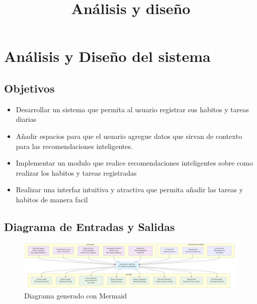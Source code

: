 \documentclass{pretexto/report}
\title{Análisis y diseño}
\begin{document}

                                                     

\tableofcontents 
\pagebreak



\pagebreak
\section{Análisis y Diseño del sistema}

\subsection{Objetivos}

\begin{itemize}
    \item Desarrollar un sistema que permita al usuario registrar sus habitos y tareas diarias
    \item Añadir espacios para que el usuario agregue datos que sirvan de contexto para las recomendaciones inteligentes.
    \item Implementar un modulo que realice recomendaciones inteligentes sobre como realizar los habitos y tareas registradas
    \item Realizar una interfaz intuitiva y atractiva que permita añadir las tareas y habitos de manera facil
\end{itemize}


\subsection{Diagrama de Entradas y Salidas}

\begin{figure}[H]
    \centering
    \includegraphics[width=\linewidth]{pngs/e_s.png}
    \caption{Diagrama generado con Mermaid}
\end{figure}
\end{document}
